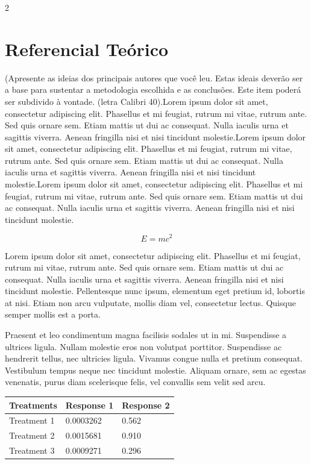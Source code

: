 \documentclass[article,9pt,a4paper]{abntex2}
\begin{document}
\begin{multicols}{2}
\section{Referencial Teórico}
(Apresente as ideias dos principais autores que você leu. Estas ideais deverão ser a base para sustentar a metodologia escolhida e as conclusões. Este item poderá ser subdivido à vontade. (letra Calibri 40).Lorem ipsum dolor sit amet, consectetur adipiscing elit. Phasellus et mi feugiat, rutrum mi vitae, rutrum ante. Sed quis ornare sem. Etiam mattis ut dui ac consequat. Nulla iaculis urna et sagittis viverra. Aenean fringilla nisi et nisi tincidunt molestie.Lorem ipsum dolor sit amet, consectetur adipiscing elit. Phasellus et mi feugiat, rutrum mi vitae, rutrum ante. Sed quis ornare sem. Etiam mattis ut dui ac consequat. Nulla iaculis urna et sagittis viverra. Aenean fringilla nisi et nisi tincidunt molestie.Lorem ipsum dolor sit amet, consectetur adipiscing elit. Phasellus et mi feugiat, rutrum mi vitae, rutrum ante. Sed quis ornare sem. Etiam mattis ut dui ac consequat. Nulla iaculis urna et sagittis viverra. Aenean fringilla nisi et nisi tincidunt molestie.


\begin{equation}
E = mc^{2}
\label{eqn:Einstein}
\end{equation}

Lorem ipsum dolor sit amet, consectetur adipiscing elit. Phasellus et mi feugiat, rutrum mi vitae, rutrum ante. Sed quis ornare sem. Etiam mattis ut dui ac consequat. Nulla iaculis urna et sagittis viverra. Aenean fringilla nisi et nisi tincidunt molestie. Pellentesque nunc ipsum, elementum eget pretium id, lobortis at nisi. Etiam non arcu vulputate, mollis diam vel, consectetur lectus. Quisque semper mollis est a porta.

Praesent et leo condimentum magna facilisis sodales ut in mi. Suspendisse a ultrices ligula. Nullam molestie eros non volutpat porttitor. Suspendisse ac hendrerit tellus, nec ultricies ligula. Vivamus congue nulla et pretium consequat. Vestibulum tempus neque nec tincidunt molestie. Aliquam ornare, sem ac egestas venenatis, purus diam scelerisque felis, vel convallis sem velit sed arcu.

\begin{center}
\begin{tabular}{l l l}
\toprule
\textbf{Treatments} & \textbf{Response 1} & \textbf{Response 2}\\
\midrule
Treatment 1 & 0.0003262 & 0.562 \\
Treatment 2 & 0.0015681 & 0.910 \\
Treatment 3 & 0.0009271 & 0.296 \\
\bottomrule
\end{tabular}
\end{center}


\end{multicols}
\end{document}
